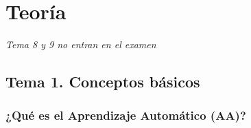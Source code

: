 \documentclass[12pt]{book} %
\begin{document}
\newpage
\thispagestyle{empty}
\mbox{}

\newpage
\thispagestyle{empty}
\mbox{}






\tableofcontents
\clearpage
\thispagestyle{empty} %

%
%

\hypertarget{teoruxeda}{%
\chapter{Teoría}\label{teoruxeda}}

\emph{Tema 8 y 9 no entran en el examen}

\hypertarget{tema-1.-conceptos-buxe1sicos}{%
\section{Tema 1. Conceptos básicos}\label{tema-1.-conceptos-buxe1sicos}}

\hypertarget{quuxe9-es-el-aprendizaje-automuxe1tico-aa}{%
\subsection{¿Qué es el Aprendizaje Automático
(AA)?}\label{quuxe9-es-el-aprendizaje-automuxe1tico-aa}}
\end{document}
